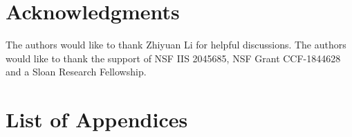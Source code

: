 \documentclass{article}
\numberwithin{equation}{section}
\numberwithin{theorem}{section}
\begin{document}
\section*{Acknowledgments}

The authors would like to thank Zhiyuan Li for helpful discussions. The authors would like to thank the support of NSF IIS 2045685, NSF Grant CCF-1844628 and a Sloan Research Fellowship.





\newpage
\appendix
\section*{List of Appendices}
\startcontents[sections]
\newpage








\end{document}
